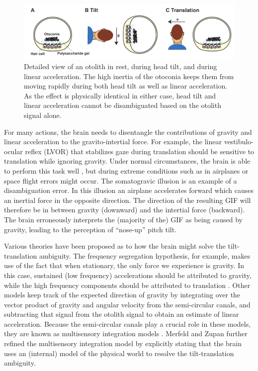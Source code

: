 \begin{figure}
    \includegraphics[width=1.0\textwidth]{src/intro/figures/otoliths.pdf}
    \caption{Detailed view of an otolith  in rest,  during head tilt, and  during linear acceleration. The high inertia of the otoconia keeps them from moving rapidly during both head tilt as well as linear acceleration. As the effect is physically identical in either case, head tilt and linear acceleration cannot be disambiguated based on the otolith signal alone.}
    \label{intro:fig:otoliths}
\end{figure}

For many actions, the brain needs to disentangle the contributions of gravity and linear acceleration to the gravito-intertial force. For example, the linear vestibulo-ocular reflex (LVOR) that stabilizes gaze during translation should be sensitive to translation while ignoring gravity. Under normal circumstances, the brain is able to perform this task well \cite{merfeld1995}, but during extreme conditions such as in airplanes or space flight errors might occur. The somatogravic illusion \cite{glasauer1995} is an example of a disambiguation error. In this illusion an airplane accelerates forward which causes an inertial force in the opposite direction. The direction of the resulting GIF will therefore be in between gravity (downward) and the intertial force (backward). The brain erroneously interprets the (majority of the) GIF as being caused by gravity, leading to the perception of ``nose-up'' pitch tilt.

Various theories have been proposed as to how the brain might solve the tilt-translation ambiguity. The frequency segregation hypothesis, for example, makes use of the fact that when stationary, the only force we experience is gravity. In this case, sustained (low frequency) accelerations should be  attributed to gravity, while the high frequency components should be attributed to translation \cite{paige1991, telford1997}. Other models keep track of the expected direction of gravity by integrating over the vector product of gravity and angular velocity from the semi-circular canals, and subtracting that signal from the otolith signal to obtain an estimate of linear acceleration. Because the semi-circular canals play a crucial role in these models, they are known as multisensory integration models \cite{mayne1974,ormsby1977}. Merfeld and Zupan \citeyear{merfeld1995,merfeld2002} further refined the multisensory integration model by explicitly stating that the brain uses an (internal) model of the physical world to resolve the tilt-translation ambiguity.

